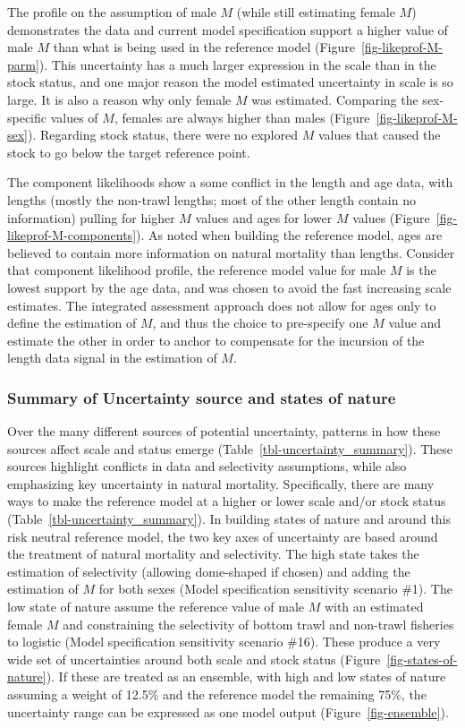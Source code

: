 \documentclass[
]{scrartcl}
\begin{document}
The profile on the assumption of male \(M\) (while still estimating
female \(M\)) demonstrates the data and current model specification
support a higher value of male \(M\) than what is being used in the
reference model (Figure~\ref{fig-likeprof-M-parm}). This uncertainty has
a much larger expression in the scale than in the stock status, and one
major reason the model estimated uncertainty in scale is so large. It is
also a reason why only female \(M\) was estimated. Comparing the
sex-specific values of \(M\), females are always higher than males
(Figure~\ref{fig-likeprof-M-sex}). Regarding stock status, there were no
explored \(M\) values that caused the stock to go below the target
reference point.

The component likelihoods show a some conflict in the length and age
data, with lengths (mostly the non-trawl lengths; most of the other
length contain no information) pulling for higher \(M\) values and ages
for lower \(M\) values (Figure~\ref{fig-likeprof-M-components}). As
noted when building the reference model, ages are believed to contain
more information on natural mortality than lengths. Consider that
component likelihood profile, the reference model value for male \(M\)
is the lowest support by the age data, and was chosen to avoid the fast
increasing scale estimates. The integrated assessment approach does not
allow for ages only to define the estimation of \(M\), and thus the
choice to pre-specify one \(M\) value and estimate the other in order to
anchor to compensate for the incursion of the length data signal in the
estimation of \(M\).

\subsubsection{Summary of Uncertainty source and states of
nature}\label{summary-of-uncertainty-source-and-states-of-nature}

Over the many different sources of potential uncertainty, patterns in
how these sources affect scale and status emerge
(Table~\ref{tbl-uncertainty_summary}). These sources highlight conflicts
in data and selectivity assumptions, while also emphasizing key
uncertainty in natural mortality. Specifically, there are many ways to
make the reference model at a higher or lower scale and/or stock status
(Table~\ref{tbl-uncertainty_summary}). In building states of nature and
around this risk neutral reference model, the two key axes of
uncertainty are based around the treatment of natural mortality and
selectivity. The high state takes the estimation of selectivity
(allowing dome-shaped if chosen) and adding the estimation of \(M\) for
both sexes (Model specification sensitivity scenario \#1). The low state
of nature assume the reference value of male \(M\) with an estimated
female \(M\) and constraining the selectivity of bottom trawl and
non-trawl fisheries to logistic (Model specification sensitivity
scenario \#16). These produce a very wide set of uncertainties around
both scale and stock status (Figure~\ref{fig-states-of-nature}). If
these are treated as an ensemble, with high and low states of nature
assuming a weight of 12.5\% and the reference model the remaining 75\%,
the uncertainty range can be expressed as one model output
(Figure~\ref{fig-ensemble}).
\end{document}
